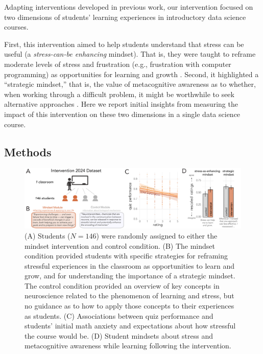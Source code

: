 \documentclass[10pt,letterpaper]{article}
\begin{document}
Adapting interventions developed in previous work, our intervention focused on two dimensions of students' learning experiences in introductory data science courses.

First, this intervention aimed to help students understand that stress can be useful (a \textit{stress-can-be enhancing} mindset). That is, they were taught to reframe moderate levels of stress and frustration (e.g., frustration with computer programming) as opportunities for learning and growth \cite{yeager2022synergistic, crum2013rethinking}. 
Second, it highlighted a “strategic mindset,” that is, the value of metacognitive awareness as to whether, when working through a difficult problem, it might be worthwhile to seek alternative approaches \cite{Chen2020strategic}. 
Here we report initial insights from measuring the impact of this intervention on these two dimensions in a single data science course.

\subsection{Methods}
\begin{figure}[t]
\begin{center}
\includegraphics[width=0.99\linewidth]{figures_cogsci/2024_experimental_methods_results_combined.pdf}
\end{center}
\caption{
(A) Students ($N=146$) were randomly assigned to either the mindset intervention and control condition. 
(B) The mindset condition provided students with specific strategies for reframing stressful experiences in the classroom as opportunities to learn and grow, and for understanding the importance of a strategic mindset. The control condition provided an overview of key concepts in neuroscience related to the phenomenon of learning and stress, but no guidance as to how to apply those concepts to their experiences as students.
(C) Associations between quiz performance and students' initial math anxiety and expectations about how stressful the course would be.
(D) Student mindsets about stress and metacognitive awareness while learning following the intervention. %
}
\label{fig:intervention-experiment-flow}
\end{figure}
\end{document}
